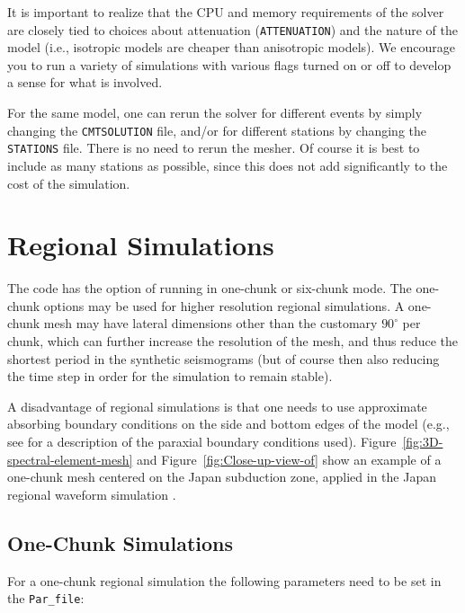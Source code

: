 \documentclass[oneside,english]{book}
\begin{document}
It is important to realize that the CPU and memory requirements of
the solver are closely tied to choices about attenuation (\texttt{ATTENUATION})
and the nature of the model (i.e., isotropic models are cheaper than
anisotropic models). We encourage you to run a variety of simulations
with various flags turned on or off to develop a sense for what is
involved.

For the same model, one can rerun the solver for different events
by simply changing the \texttt{CMTSOLUTION} file, and/or for different
stations by changing the \texttt{STATIONS} file. There is no need
to rerun the mesher. Of course it is best to include as many stations
as possible, since this does not add significantly to the cost of
the simulation.


\chapter{\label{cha:Regional-Simulations}Regional Simulations}


The code has the option of running in one-chunk or six-chunk mode.
The one-chunk options may be used for higher resolution regional
simulations. A one-chunk mesh may have lateral dimensions other than
the customary $90^{\circ}$ per chunk, which can further increase
the resolution of the mesh, and thus reduce the shortest period in
the synthetic seismograms (but of course then also reducing the time
step in order for the simulation to remain stable).

A disadvantage of regional simulations is that one needs to use approximate absorbing
boundary conditions on the side and bottom edges of the model (e.g.,
see \citet{KoTr99} for a description of the paraxial boundary conditions
used). Figure~\vref{fig:3D-spectral-element-mesh} and Figure~\vref{fig:Close-up-view-of}
show an example of a one-chunk mesh centered on the Japan subduction
zone, applied in the Japan regional waveform simulation \citep{ChTrHeKa07}.


\section{One-Chunk Simulations\label{sec:One-Chunk-Simulations}}

For a one-chunk regional simulation the following parameters need
to be set in the \texttt{Par\_file}:
\end{document}
